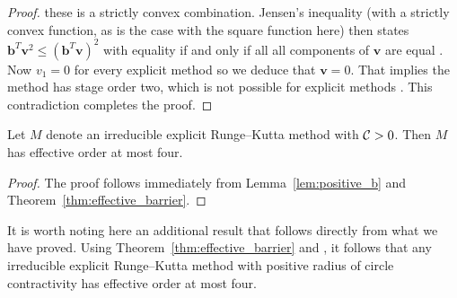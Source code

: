 \begin{proof}
  these is a strictly convex combination.
  Jensen's inequality (with a strictly convex function, as is the case with the
  square function here) then states $\bm{b}^T \bm{v}^2 \leq (\bm{b}^T
  \bm{v})^2$ with equality if and only if all
  all components of $\bm{v}$ are equal
  \cite[Theorem 12, pg 31]{Bullen:inequalities}.
  Now $v_1 = 0$ for every explicit method so we deduce that $\bm{v}=0$.
  That implies the method has stage order two, which is not possible for
  explicit methods \cite{Ruuth2002}.
  This contradiction completes the proof.
\end{proof}

\begin{corollary}\label{cor:no_SSP_5}
    Let $M$ denote an irreducible explicit Runge--Kutta method with $\mathcal{C}>0$.
    Then $M$ has effective order at most four.
\end{corollary}
\begin{proof}
	The proof follows immediately from Lemma~\ref{lem:positive_b} and 
	Theorem~\ref{thm:effective_barrier}.
\end{proof}

\begin{remark}
    It is worth noting here an additional result that 
    follows directly from what we have proved.
    Using Theorem~\ref{thm:effective_barrier} and \cite[Theorem~4.1]{dahlquist2006}, 
    it follows that any irreducible explicit Runge--Kutta method with positive radius of
    circle contractivity has effective order at most four.
\end{remark}


